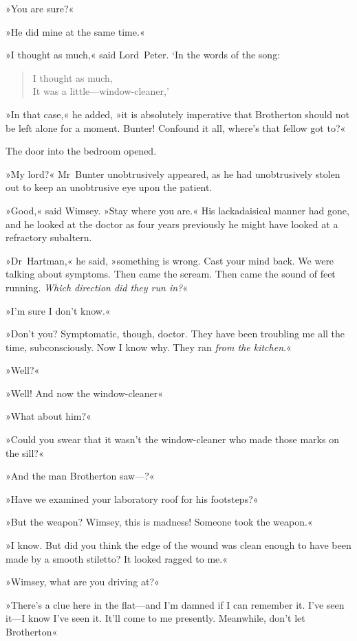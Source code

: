 »You are sure?«

»He did mine at the same time.«

»I thought as much,« said Lord~Peter. `In the words of the song:

\begin{verse}
I thought as much,\\
It was a little—window-cleaner,'
\end{verse}

»In that case,« he added, »it is absolutely imperative that Brotherton should not be left alone for a moment. Bunter! Confound it all, where's that fellow got to?«

The door into the bedroom opened.

»My lord?« Mr~Bunter unobtrusively appeared, as he had unobtrusively stolen out to keep an unobtrusive eye upon the patient.

»Good,« said Wimsey. »Stay where you are.« His lackadaisical manner had gone, and he looked at the doctor as four years previously he might have looked at a refractory subaltern.

»Dr~Hartman,« he said, »something is wrong. Cast your mind back. We were talking about symptoms. Then came the scream. Then came the sound of feet running. \textit{Which direction did they run in?}«

»I'm sure I don't know.«

»Don't you? Symptomatic, though, doctor. They have been troubling me all the time, subconsciously. Now I know why. They ran \textit{from the kitchen}.«

»Well?«

»Well! And now the window-cleaner\longdash«

»What about him?«

»Could you swear that it wasn't the window-cleaner who made those marks on the sill?«

»And the man Brotherton saw—?«

»Have we examined your laboratory roof for his footsteps?«

»But the weapon? Wimsey, this is madness! Someone took the weapon.«

»I know. But did you think the edge of the wound was clean enough to have been made by a smooth stiletto? It looked ragged to me.«

»Wimsey, what are you driving at?«

»There's a clue here in the flat—and I'm damned if I can remember it. I've seen it—I know I've seen it. It'll come to me presently. Meanwhile, don't let Brotherton\longdash«

